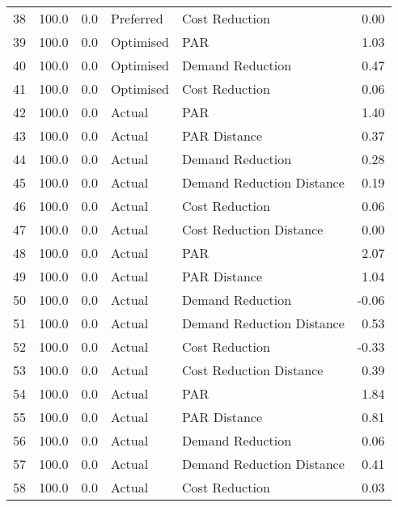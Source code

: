 \begin{longtable}{lrrllr}
38   &        100.0 &     0.0 &      Preferred &             Cost Reduction &   0.00 \\
39   &        100.0 &     0.0 &      Optimised &                        PAR &   1.03 \\
40   &        100.0 &     0.0 &      Optimised &           Demand Reduction &   0.47 \\
41   &        100.0 &     0.0 &      Optimised &             Cost Reduction &   0.06 \\
42   &        100.0 &     0.0 &         Actual &                        PAR &   1.40 \\
43   &        100.0 &     0.0 &         Actual &               PAR Distance &   0.37 \\
44   &        100.0 &     0.0 &         Actual &           Demand Reduction &   0.28 \\
45   &        100.0 &     0.0 &         Actual &  Demand Reduction Distance &   0.19 \\
46   &        100.0 &     0.0 &         Actual &             Cost Reduction &   0.06 \\
47   &        100.0 &     0.0 &         Actual &    Cost Reduction Distance &   0.00 \\
48   &        100.0 &     0.0 &         Actual &                        PAR &   2.07 \\
49   &        100.0 &     0.0 &         Actual &               PAR Distance &   1.04 \\
50   &        100.0 &     0.0 &         Actual &           Demand Reduction &  -0.06 \\
51   &        100.0 &     0.0 &         Actual &  Demand Reduction Distance &   0.53 \\
52   &        100.0 &     0.0 &         Actual &             Cost Reduction &  -0.33 \\
53   &        100.0 &     0.0 &         Actual &    Cost Reduction Distance &   0.39 \\
54   &        100.0 &     0.0 &         Actual &                        PAR &   1.84 \\
55   &        100.0 &     0.0 &         Actual &               PAR Distance &   0.81 \\
56   &        100.0 &     0.0 &         Actual &           Demand Reduction &   0.06 \\
57   &        100.0 &     0.0 &         Actual &  Demand Reduction Distance &   0.41 \\
58   &        100.0 &     0.0 &         Actual &             Cost Reduction &   0.03 \\

\end{longtable}
